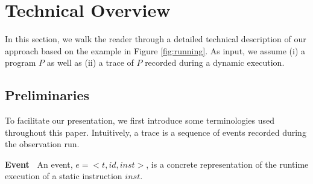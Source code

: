 \section{Technical Overview}\label{sec:overview}

In this section, we walk the reader through a detailed technical description of our approach based on the example in Figure \ref{fig:running}. 
%
As input, we assume (i) a program $P$ as well as (ii) a trace of $P$ recorded during a dynamic execution.



\subsection{Preliminaries}
To facilitate our presentation, we first introduce some terminologies used throughout this paper. Intuitively, a trace is a sequence of events recorded during the observation run.




{\bf Event\ } An event, $e=<t, id, inst>$, is a concrete representation of the runtime execution of a static instruction $inst$.


